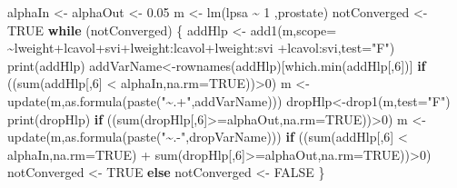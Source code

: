 \documentclass[
  dutch,
  letterpaper,
  12pt]{book}
\newenvironment{Shaded}{\begin{snugshade}}{\end{snugshade}}
\newcommand{\AttributeTok}[1]{\textcolor[rgb]{0.40,0.45,0.13}{#1}}
\newcommand{\ConstantTok}[1]{\textcolor[rgb]{0.56,0.35,0.01}{#1}}
\newcommand{\ControlFlowTok}[1]{\textcolor[rgb]{0.00,0.23,0.31}{\textbf{#1}}}
\newcommand{\DecValTok}[1]{\textcolor[rgb]{0.68,0.00,0.00}{#1}}
\newcommand{\FloatTok}[1]{\textcolor[rgb]{0.68,0.00,0.00}{#1}}
\newcommand{\FunctionTok}[1]{\textcolor[rgb]{0.28,0.35,0.67}{#1}}
\newcommand{\NormalTok}[1]{\textcolor[rgb]{0.00,0.23,0.31}{#1}}
\newcommand{\OtherTok}[1]{\textcolor[rgb]{0.00,0.23,0.31}{#1}}
\newcommand{\SpecialCharTok}[1]{\textcolor[rgb]{0.37,0.37,0.37}{#1}}
\newcommand{\StringTok}[1]{\textcolor[rgb]{0.13,0.47,0.30}{#1}}
\theoremstyle{definition}
\theoremstyle{definition}
\theoremstyle{definition}
\theoremstyle{remark}
\begin{document}
\begin{Shaded}
\begin{Highlighting}[]
\NormalTok{alphaIn }\OtherTok{\textless{}{-}}\NormalTok{ alphaOut }\OtherTok{\textless{}{-}} \FloatTok{0.05}
\NormalTok{m }\OtherTok{\textless{}{-}} \FunctionTok{lm}\NormalTok{(lpsa }\SpecialCharTok{\textasciitilde{}} \DecValTok{1}\NormalTok{ ,prostate)}
\NormalTok{notConverged }\OtherTok{\textless{}{-}} \ConstantTok{TRUE}
\ControlFlowTok{while}\NormalTok{ (notConverged)}
\NormalTok{\{}
\NormalTok{addHlp }\OtherTok{\textless{}{-}} \FunctionTok{add1}\NormalTok{(m,}\AttributeTok{scope=} \SpecialCharTok{\textasciitilde{}}\NormalTok{lweight}\SpecialCharTok{+}\NormalTok{lcavol}\SpecialCharTok{+}\NormalTok{svi}\SpecialCharTok{+}\NormalTok{lweight}\SpecialCharTok{:}\NormalTok{lcavol}\SpecialCharTok{+}\NormalTok{lweight}\SpecialCharTok{:}\NormalTok{svi }\SpecialCharTok{+}\NormalTok{lcavol}\SpecialCharTok{:}\NormalTok{svi,}\AttributeTok{test=}\StringTok{"F"}\NormalTok{)}
\FunctionTok{print}\NormalTok{(addHlp)}
\NormalTok{addVarName}\OtherTok{\textless{}{-}}\FunctionTok{rownames}\NormalTok{(addHlp)[}\FunctionTok{which.min}\NormalTok{(addHlp[,}\DecValTok{6}\NormalTok{])]}
\ControlFlowTok{if}\NormalTok{ ((}\FunctionTok{sum}\NormalTok{(addHlp[,}\DecValTok{6}\NormalTok{] }\SpecialCharTok{\textless{}}\NormalTok{ alphaIn,}\AttributeTok{na.rm=}\ConstantTok{TRUE}\NormalTok{))}\SpecialCharTok{\textgreater{}}\DecValTok{0}\NormalTok{) m }\OtherTok{\textless{}{-}} \FunctionTok{update}\NormalTok{(m,}\FunctionTok{as.formula}\NormalTok{(}\FunctionTok{paste}\NormalTok{(}\StringTok{"\textasciitilde{}.+"}\NormalTok{,addVarName)))}
\NormalTok{dropHlp}\OtherTok{\textless{}{-}}\FunctionTok{drop1}\NormalTok{(m,}\AttributeTok{test=}\StringTok{"F"}\NormalTok{)}
\FunctionTok{print}\NormalTok{(dropHlp)}
\ControlFlowTok{if}\NormalTok{ ((}\FunctionTok{sum}\NormalTok{(dropHlp[,}\DecValTok{6}\NormalTok{]}\SpecialCharTok{\textgreater{}=}\NormalTok{alphaOut,}\AttributeTok{na.rm=}\ConstantTok{TRUE}\NormalTok{))}\SpecialCharTok{\textgreater{}}\DecValTok{0}\NormalTok{) m }\OtherTok{\textless{}{-}} \FunctionTok{update}\NormalTok{(m,}\FunctionTok{as.formula}\NormalTok{(}\FunctionTok{paste}\NormalTok{(}\StringTok{"\textasciitilde{}.{-}"}\NormalTok{,dropVarName)))}
\ControlFlowTok{if}\NormalTok{ ((}\FunctionTok{sum}\NormalTok{(addHlp[,}\DecValTok{6}\NormalTok{] }\SpecialCharTok{\textless{}}\NormalTok{ alphaIn,}\AttributeTok{na.rm=}\ConstantTok{TRUE}\NormalTok{) }\SpecialCharTok{+} \FunctionTok{sum}\NormalTok{(dropHlp[,}\DecValTok{6}\NormalTok{]}\SpecialCharTok{\textgreater{}=}\NormalTok{alphaOut,}\AttributeTok{na.rm=}\ConstantTok{TRUE}\NormalTok{))}\SpecialCharTok{\textgreater{}}\DecValTok{0}\NormalTok{) notConverged }\OtherTok{\textless{}{-}} \ConstantTok{TRUE} \ControlFlowTok{else}\NormalTok{ notConverged }\OtherTok{\textless{}{-}} \ConstantTok{FALSE}
\NormalTok{\}}
\end{Highlighting}
\end{Shaded}
\end{document}
